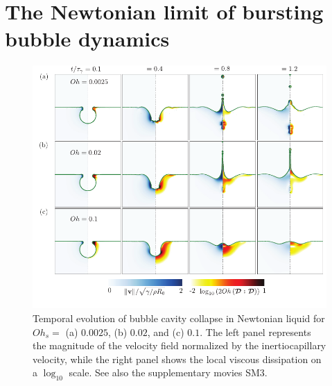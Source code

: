 \documentclass{jfm}
\newcommand{\AKD}[1]{{\textcolor{black}{#1}}}
\begin{document}
\appendix

\section{The Newtonian limit of bursting bubble dynamics}
\label{app:newtonian_limit}
\renewcommand{\thefigure}{\Alph{section}\,\arabic{figure}}
\setcounter{figure}{0}

\begin{figure}
	\includegraphics[width=\textwidth]{Figures/Facets_time_Oh_Newt/Facets_time_Oh_Newt_05-eps-converted-to.pdf}
	\caption{Temporal evolution of bubble cavity collapse in Newtonian liquid for $Oh_s =$ (a) $0.0025$, (b) $0.02$\AKD{,} and (c) $0.1$. The left panel represents the magnitude of the velocity field normalized by the inertiocapillary velocity, while the right panel shows the local viscous dissipation on a $\log_{10}$ scale. See also the supplementary movies SM3.}
	\label{facets_time_Oh_Newt}
\end{figure}
\end{document}
